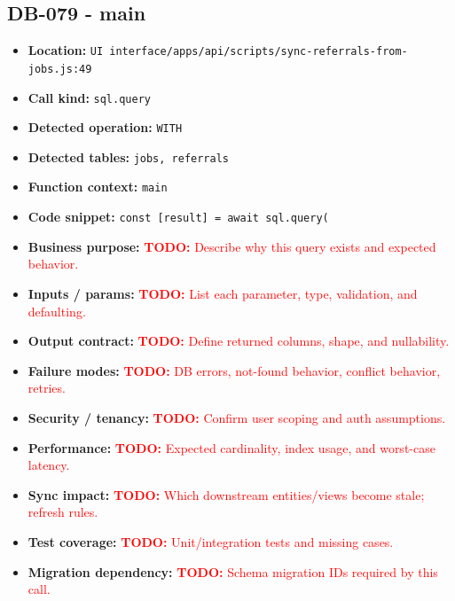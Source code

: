 \documentclass[11pt]{article}
\newcommand{\todoitem}[1]{\textcolor{red}{\textbf{TODO:} #1}}
\begin{document}
\subsection{DB-079 - main}
\begin{itemize}[leftmargin=1.5em]
\item \textbf{Location:} \texttt{UI interface/apps/api/scripts/sync-referrals-from-jobs.js:49}
\item \textbf{Call kind:} \texttt{sql.query}
\item \textbf{Detected operation:} \texttt{WITH}
\item \textbf{Detected tables:} \texttt{jobs, referrals}
\item \textbf{Function context:} \texttt{main}
\item \textbf{Code snippet:} \texttt{const [result] = await sql.query(}
\item \textbf{Business purpose:} \todoitem{Describe why this query exists and expected behavior.}
\item \textbf{Inputs / params:} \todoitem{List each parameter, type, validation, and defaulting.}
\item \textbf{Output contract:} \todoitem{Define returned columns, shape, and nullability.}
\item \textbf{Failure modes:} \todoitem{DB errors, not-found behavior, conflict behavior, retries.}
\item \textbf{Security / tenancy:} \todoitem{Confirm user scoping and auth assumptions.}
\item \textbf{Performance:} \todoitem{Expected cardinality, index usage, and worst-case latency.}
\item \textbf{Sync impact:} \todoitem{Which downstream entities/views become stale; refresh rules.}
\item \textbf{Test coverage:} \todoitem{Unit/integration tests and missing cases.}
\item \textbf{Migration dependency:} \todoitem{Schema migration IDs required by this call.}
\end{itemize}
\end{document}
